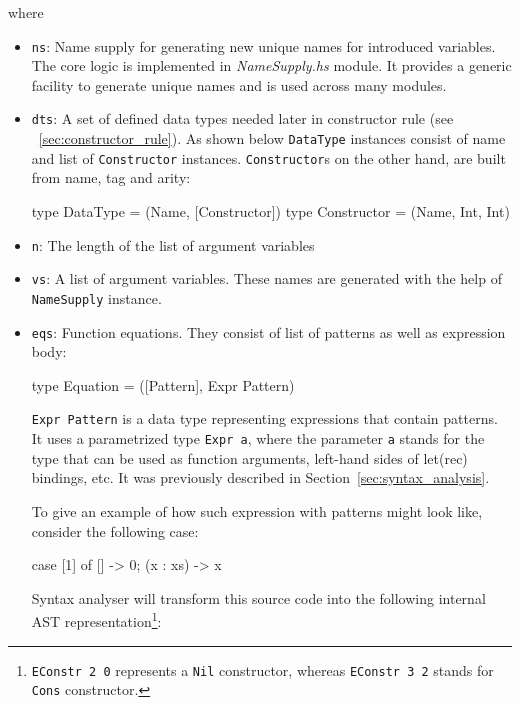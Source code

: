 \documentclass[12pt,a4paper]{report}
\begin{document}
where
\begin{itemize}
  \item \texttt{ns}: Name supply for generating new unique names for
    introduced variables. The core logic is implemented in
    \textit{NameSupply.hs} module. It provides a generic facility to generate
    unique names and is used across many modules.
  \item \texttt{dts}: A set of defined data types needed later in constructor
    rule (see ~\ref{sec:constructor_rule}). As shown below \texttt{DataType}
    instances consist of name and list of \texttt{Constructor} instances.
    \texttt{Constructor}s on the other hand, are built from name, tag and arity:

\vspace*{0.2in}
\begin{code}[style=haskell]
  type DataType = (Name, [Constructor])
  type Constructor = (Name, Int, Int)
\end{code}

  \item \texttt{n}: The length of the list of argument variables
  \item \texttt{vs}: A list of argument variables. These names are generated
    with the help of \texttt{NameSupply} instance.
  \item \texttt{eqs}: Function equations. They consist of list of patterns as
    well as expression body:

\vspace*{0.2in}
\begin{code}[style=haskell]
  type Equation = ([Pattern], Expr Pattern)
\end{code}

\texttt{Expr Pattern} is a data type representing expressions that contain
patterns. It uses a parametrized type \texttt{Expr a}, where the parameter
\texttt{a} stands for the type that can be used as function arguments,
left-hand sides of let(rec) bindings, etc. It was previously described in
Section~\ref{sec:syntax_analysis}.

To give an example of how such expression with patterns might look like,
consider the following case:

\vspace*{0.2in}
\begin{code}[style=haskell]
  case [1] of
      []       -> 0;
      (x : xs) -> x
\end{code}

Syntax analyser will transform this source code into the following internal AST
representation\footnote{\texttt{EConstr 2 0} represents a \texttt{Nil}
constructor, whereas \texttt{EConstr 3 2} stands for \texttt{Cons} constructor.}:


\end{itemize}
\end{document}
